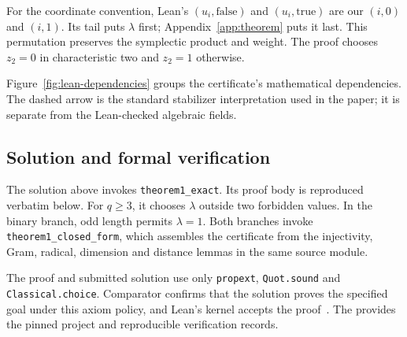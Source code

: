 For the coordinate convention, Lean's $(u_i,\mathrm{false})$ and
$(u_i,\mathrm{true})$ are our
$(i,0)$ and $(i,1)$. Its tail puts $\lambda$ first; Appendix~\ref{app:theorem}
puts it last. This permutation preserves the symplectic product and weight.
The proof chooses $z_2=0$ in characteristic two and $z_2=1$ otherwise.

Figure~\ref{fig:lean-dependencies} groups the certificate's mathematical
dependencies. The dashed arrow is the standard stabilizer interpretation
used in the paper; it is separate from the Lean-checked algebraic fields.

\FloatBarrier

\subsection{Solution and formal verification}\label{app:lean-replay}
The solution above invokes \texttt{theorem1\_exact}. Its proof body is
reproduced verbatim below. For $q\ge3$, it chooses $\lambda$ outside two
forbidden values. In the binary branch, odd length permits $\lambda=1$.
Both branches invoke \texttt{theorem1\_closed\_form}, which assembles the
certificate from the injectivity, Gram, radical, dimension and distance
lemmas in the same source module.



The proof and submitted solution use only \texttt{propext},
\texttt{Quot.sound} and \texttt{Classical.choice}. Comparator confirms
that the solution proves the specified goal under this axiom policy,
and Lean's kernel accepts the proof~\citep{LeanComparator}.
The \artifactlink{} provides the pinned project and reproducible
verification records.
